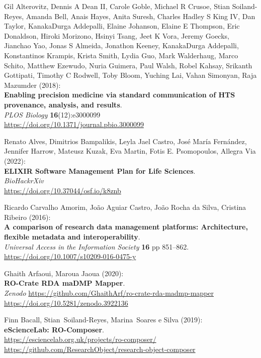 \begin{thebibliography}{9}
Gil Alterovitz, Dennis A Dean II, Carole Goble, Michael R
Crusoe, Stian Soiland-Reyes, Amanda Bell, Anais Hayes, Anita Suresh,
Charles Hadley S King IV, Dan Taylor, KanakaDurga Addepalli, Elaine
Johanson, Elaine E Thompson, Eric Donaldson, Hiroki Morizono, Hsinyi
Tsang, Jeet K Vora, Jeremy Goecks, Jianchao Yao, Jonas S Almeida,
Jonathon Keeney, KanakaDurga Addepalli, Konstantinos Krampis, Krista
Smith, Lydia Guo, Mark Walderhaug, Marco Schito, Matthew Ezewudo, Nuria
Guimera, Paul Walsh, Robel Kahsay, Srikanth Gottipati, Timothy C
Rodwell, Toby Bloom, Yuching Lai, Vahan Simonyan, Raja Mazumder
(2018):\\
\textbf{Enabling precision medicine via standard communication of HTS
provenance, analysis, and results}.\\
\emph{PLOS Biology} \textbf{16}(12):e3000099\\
\url{https://doi.org/10.1371/journal.pbio.3000099}

Renato Alves, Dimitrios Bampalikis, Leyla Jael Castro,
José María Fernández, Jennifer Harrow, Mateusz Kuzak, Eva Martin, Fotis
E. Psomopoulos, Allegra Via (2022):\\
\textbf{ELIXIR Software Management Plan for Life Sciences}.\\
\emph{BioHackrXiv}\\
\url{https://doi.org/10.37044/osf.io/k8znb}

Ricardo Carvalho Amorim, João Aguiar Castro, João Rocha da
Silva, Cristina Ribeiro (2016):\\
\textbf{A comparison of research data management platforms:
Architecture, flexible metadata and interoperability}.\\
\emph{Universal Access in the Information Society} \textbf{16} pp
851--862.\\
\url{https://doi.org/10.1007/s10209-016-0475-y}

Ghaith Arfaoui, Maroua Jaoua (2020):\\
\textbf{RO-Crate RDA maDMP Mapper}.\\
\emph{Zenodo}
\url{https://github.com/GhaithArf/ro-crate-rda-madmp-mapper}\\
\url{https://doi.org/10.5281/zenodo.3922136}

Finn Bacall, Stian~Soiland-Reyes, Marina~Soares e Silva
(2019):\\
\textbf{eScienceLab: RO-Composer}.\\
\url{https://esciencelab.org.uk/projects/ro-composer/}\\
\url{https://github.com/ResearchObject/research-object-composer}


\end{thebibliography}
